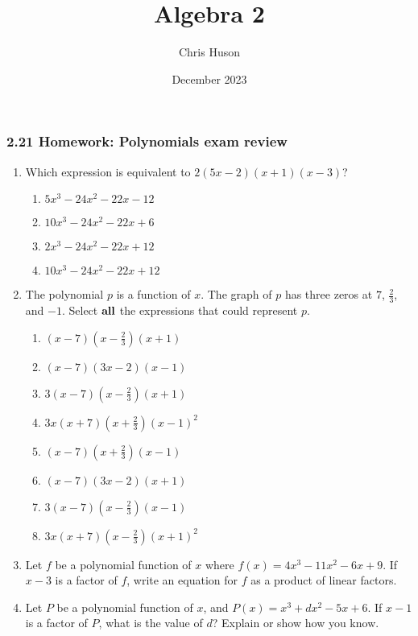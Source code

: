\documentclass[12pt, twoside]{article}
\title{Algebra 2}
\author{Chris Huson}
\date{December 2023}
\begin{document}
\subsubsection*{2.21 Homework: Polynomials exam review}
\begin{enumerate}
\item Which expression is equivalent to $2(5x-2)(x+1)(x-3)$? \vspace{0.25cm}
    \begin{enumerate}
        \item $5x^3-24x^2-22x-12$ 
        \item $10x^3-24x^2-22x+6$ 
        \item $2x^3-24x^2-22x+12$ 
        \item $10x^3-24x^2-22x+12$ 
    \end{enumerate} \vspace{0.5cm}

\item The polynomial $p$ is a function of $x$. The graph of $p$ has three zeros at $7$, $\frac{2}{3}$, and $-1$. Select $\bf{all}$ the expressions that could represent $p$. \vspace{0.25cm}
    \begin{multicols}{2}
    \begin{enumerate}
        \item $(x-7)(x-\frac{2}{3})(x+1)$
        \item $(x-7)(3x-2)(x-1)$
        \item $3(x-7)(x-\frac{2}{3})(x+1)$
        \item $3x(x+7)(x+\frac{2}{3})(x-1)^2$
        \item $(x-7)(x+\frac{2}{3})(x-1)$
        \item $(x-7)(3x-2)(x+1)$
        \item $3(x-7)(x-\frac{2}{3})(x-1)$
        \item $3x(x+7)(x-\frac{2}{3})(x+1)^2$
    \end{enumerate}
    \end{multicols}
        \vspace{0.5cm}

\item Let $f$ be a polynomial function of $x$ where $f(x)=4x^3-11x^2-6x+9$. If $x-3$ is a factor of $f$, write an equation for $f$ as a product of linear factors.
\vspace{5cm}

\newpage
\item Let $P$ be a polynomial function of $x$, and $P(x)=x^3+dx^2-5x+6$. If $x-1$ is a factor of $P$, what is the value of $d$? Explain or show how you know.
\vspace{6cm}


\end{enumerate}
\end{document}
